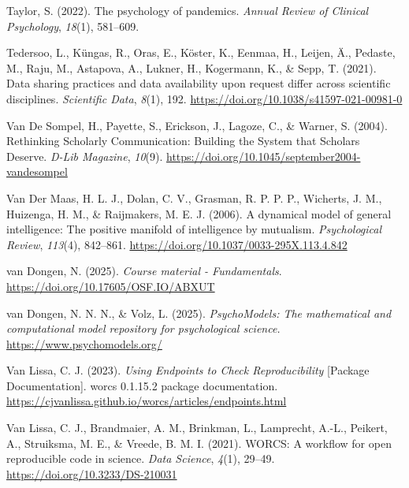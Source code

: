 \documentclass[man]{apa7}
\newlength{\cslhangindent}
\newenvironment{CSLReferences}[2] %
 {\begin{list}{}{%
  \setlength{\itemindent}{0pt}
  \setlength{\leftmargin}{0pt}
  \setlength{\parsep}{0pt}
  \ifodd #1
   \setlength{\leftmargin}{\cslhangindent}
   \setlength{\itemindent}{-1\cslhangindent}
  \fi
  \setlength{\itemsep}{#2\baselineskip}}}
 {\end{list}}
\begin{document}
\begin{CSLReferences}{1}{0}
Taylor, S. (2022). The psychology of pandemics. \emph{Annual Review of Clinical Psychology}, \emph{18}(1), 581--609.

Tedersoo, L., Küngas, R., Oras, E., Köster, K., Eenmaa, H., Leijen, Ä., Pedaste, M., Raju, M., Astapova, A., Lukner, H., Kogermann, K., \& Sepp, T. (2021). Data sharing practices and data availability upon request differ across scientific disciplines. \emph{Scientific Data}, \emph{8}(1), 192. \url{https://doi.org/10.1038/s41597-021-00981-0}

Van De Sompel, H., Payette, S., Erickson, J., Lagoze, C., \& Warner, S. (2004). Rethinking {Scholarly Communication}: {Building} the {System} that {Scholars Deserve}. \emph{D-Lib Magazine}, \emph{10}(9). \url{https://doi.org/10.1045/september2004-vandesompel}

Van Der Maas, H. L. J., Dolan, C. V., Grasman, R. P. P. P., Wicherts, J. M., Huizenga, H. M., \& Raijmakers, M. E. J. (2006). A dynamical model of general intelligence: {The} positive manifold of intelligence by mutualism. \emph{Psychological Review}, \emph{113}(4), 842--861. \url{https://doi.org/10.1037/0033-295X.113.4.842}

van Dongen, N. (2025). \emph{Course material - {Fundamentals}}. \url{https://doi.org/10.17605/OSF.IO/ABXUT}

van Dongen, N. N. N., \& Volz, L. (2025). \emph{{PsychoModels}: {The} mathematical and computational model repository for psychological science.} \url{https://www.psychomodels.org/}

Van Lissa, C. J. (2023). \emph{Using {Endpoints} to {Check Reproducibility}} {[}Package Documentation{]}. worcs 0.1.15.2 package documentation. \url{https://cjvanlissa.github.io/worcs/articles/endpoints.html}

Van Lissa, C. J., Brandmaier, A. M., Brinkman, L., Lamprecht, A.-L., Peikert, A., Struiksma, M. E., \& Vreede, B. M. I. (2021). {WORCS}: {A} workflow for open reproducible code in science. \emph{Data Science}, \emph{4}(1), 29--49. \url{https://doi.org/10.3233/DS-210031}


\end{CSLReferences}
\end{document}

